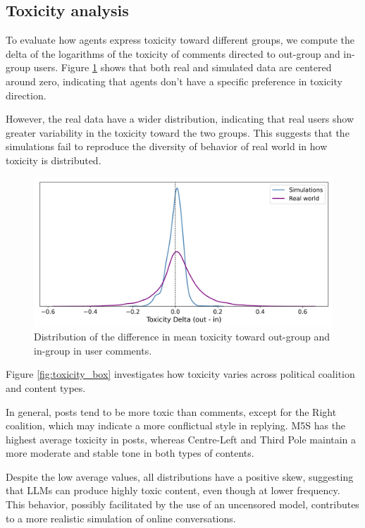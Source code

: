 \subsection{Toxicity analysis}

To evaluate how agents express toxicity toward different groups, we compute the delta of the logarithms of the toxicity of comments directed to out-group and in-group users.
Figure \ref{fig:toxicity_in_out} shows that both real and simulated data are centered around zero, indicating that agents don't have a specific preference in toxicity direction.

However, the real data have a wider distribution, indicating that real users show greater variability in the toxicity toward the two groups.
This suggests that the simulations fail to reproduce the diversity of behavior of real world  in how toxicity is distributed.



\begin{figure}[h]
    \centering
    \includegraphics[width=1\linewidth]{Images/Toxicity/diff_in_out_combined.png}
    \caption{Distribution of the difference in mean toxicity toward out-group and in-group in user comments.}
    \label{fig:toxicity_in_out}
\end{figure}


\medskip
Figure \ref{fig:toxicity_box} investigates how toxicity varies across political coalition and content types.

In general, posts tend to be more toxic than comments, except for the Right coalition, which may indicate a more conflictual style in replying.
M5S has the highest average toxicity in posts, whereas Centre-Left and Third Pole maintain a more moderate and stable tone in both types of contents.

Despite the low average values, all distributions have a positive skew, suggesting that LLMs can produce highly toxic content, even though at lower frequency.
This behavior, possibly facilitated by the use of an uncensored model, contributes to a more realistic simulation of online conversations.



